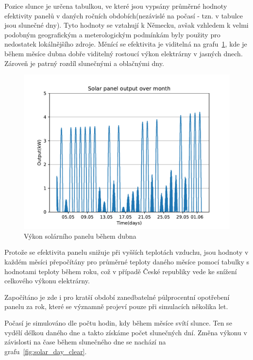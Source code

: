 \documentclass[12pt,a4paper]{article}
\begin{document}
Pozice slunce je určena tabulkou, ve které jsou vypsány průměrné hodnoty efektivity panelů v daných ročních obdobích(nezávislé na počasí - tzn. v tabulce jsou slunečné dny). Tyto hodnoty se vztahují k Německu, avšak vzhledem k velmi podobným geografickým a meterologickým podmínkám byly použity pro nedostatek lokálnějšího zdroje. Měnící se efektivita je viditelná na grafu~\ref{fig:solar_month}, kde je během měsíce dubna dobře viditelný rostoucí výkon elektrárny v jasných dnech. Zároveň je patrný rozdíl slunečnými a oblačnými dny.\cite{Paul-Frederik_Bach}

\begin{figure}
\includegraphics[width=\linewidth]{img/solar_month.pdf}
\caption{Výkon solárního panelu během dubna}
\label{fig:solar_month}
\end{figure}

Protože se efektivita panelu snižuje při vyšších teplotách vzduchu, jsou hodnoty v každém měsíci přepočítány pro průměrné teploty daného měsíce pomocí tabulky s hodnotami teploty během roku, což v případě České republiky vede ke snížení celkového výkonu elektrárny. \cite{article}

Započítáno je zde i pro kratší období zanedbatelné půlprocentní opotřebení panelu za rok, které se významně projeví pouze při simulacích několika let.

Počasí je simulováno dle počtu hodin, kdy během měsíce svítí slunce. Ten se vydělí délkou daného dne a takto získáme počet slunečných dní. Změna výkonu  v závislosti na čase během slunečného dne se nachází na grafu~\ref{fig:solar_day_clear}.\cite{9186286}
\end{document}
